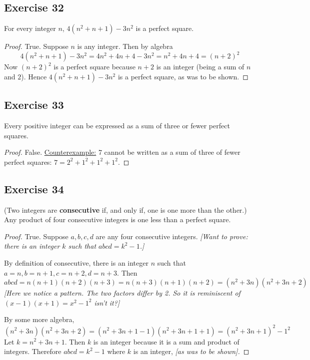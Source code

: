 \documentclass[14pt]{extarticle}
\begin{document}
\subsection{Exercise 32}
For every integer $n$, $4(n^2 + n + 1) - 3n^2$ is a perfect square.

\begin{proof}
True. Suppose $n$ is any integer. Then by algebra
$$
4(n^2 + n + 1) - 3n^2 = 4n^2 + 4n + 4 - 3n^2 = n^2 + 4n + 4 = (n + 2)^2
$$
Now $(n + 2)^2$ is a perfect square because $n + 2$ is an integer (being a sum of $n$ and $2$). Hence $4(n^2 + n + 1) - 3n^2$ is a perfect square, as was to be shown.
\end{proof}

\subsection{Exercise 33}
Every positive integer can be expressed as a sum of three or fewer perfect squares.

\begin{proof}
False. \underline{Counterexample:} 7 cannot be written as a sum of three of fewer perfect squares: $7 = 2^2 + 1^2 + 1^2 + 1^2$.
\end{proof}

\subsection{Exercise 34}
(Two integers are {\bf consecutive} if, and only if, one is one more than the other.) Any product of four consecutive integers is one less than a perfect square.

\begin{proof}
True. Suppose $a, b, c, d$ are any four consecutive integers. {\it [Want to prove: there is an integer $k$ such that $abcd = k^2 - 1$.]}

By definition of consecutive, there is an integer $n$ such that $a = n, b = n+1, c = n+2, d = n+3$. Then
$$
abcd = n(n+1)(n+2)(n+3) = n(n+3)(n+1)(n+2) = (n^2+3n)(n^2+3n+2)
$$
{\it [Here we notice a pattern. The two factors differ by 2. So it is reminiscent of $(x-1)(x+1) = x^2 - 1^2$ isn't it?]}

By some more algebra,
$$
(n^2+3n)(n^2+3n+2) = (n^2+3n+1-1)(n^2+3n+1+1) = (n^2+3n+1)^2-1^2
$$
Let $k = n^2+3n+1$. Then $k$ is an integer because it is a sum and product of integers. Therefore $abcd = k^2 - 1$ where $k$ is an integer, {\it [as was to be shown].}
\end{proof}
\end{document}
